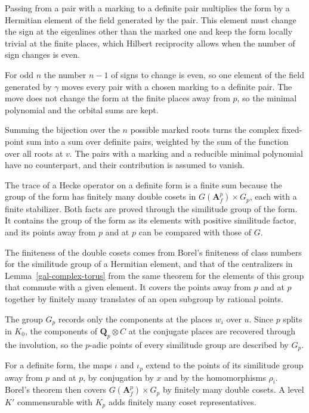 Passing from a pair with a marking to a definite pair multiplies the form by a Hermitian element of the
field generated by the pair. This element must change the sign at the eigenlines other than the marked
one and keep the form locally trivial at the finite places, which Hilbert reciprocity allows when the
number of sign changes is even.

For odd $n$ the number $n-1$ of signs to change is even, so one element of the field generated by
$\gamma$ moves every pair with a chosen marking to a definite pair. The move does not change the form at
the finite places away from $p$, so the minimal polynomial and the orbital sums are kept.

Summing the bijection over the $n$ possible marked roots turns the complex fixed-point sum into a sum
over definite pairs, weighted by the sum of the function over all roots at $v$. The pairs with a
marking and a reducible minimal polynomial have no counterpart, and their contribution is assumed to
vanish.

The trace of a Hecke operator on a definite form is a finite sum because the group of the form has
finitely many double cosets in $G(\mathbf A_f^p)\times G_p$, each with a finite stabilizer. Both facts are
proved through the similitude group of the form. It contains the group of the form as its elements with
positive similitude factor, and its points away from $p$ and at $p$ can be compared with those of $G$.

The finiteness of the double cosets comes from Borel's finiteness of class numbers for the similitude
group of a Hermitian element, and that of the centralizers in Lemma~\ref{gal-complex-torus} from the same
theorem for the elements of this group that commute with a given element. It covers the points away from $p$
and at $p$ together by finitely many translates of an open subgroup by rational points.

The group $G_p$ records only the components at the places $w_i$ over $u$. Since $p$ splits in $K_0$,
the components of $\mathbf Q_p\otimes C$ at the conjugate places are recovered through the involution, so
the $p$-adic points of every similitude group are described by $G_p$.

For a definite form, the maps $\iota$ and $\iota_p$ extend to the points of its similitude group away
from $p$ and at $p$, by conjugation by $x$ and by the homomorphisms $\rho_i$. Borel's theorem then covers
$G(\mathbf A_f^p)\times G_p$ by finitely many double cosets. A level $K'$ commensurable with $K_p$ adds
finitely many coset representatives.

